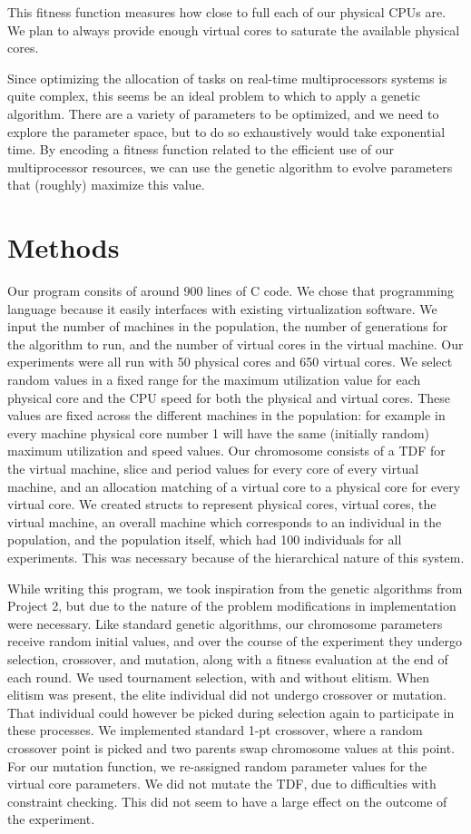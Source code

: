 \documentclass[11pt]{article}
\begin{document}
This fitness function measures how close to full each of our physical CPUs are. We plan to always provide enough virtual cores to saturate the available physical cores. 

Since optimizing the allocation of tasks on real-time multiprocessors systems is quite complex, this seems be an  ideal problem to which to apply a genetic algorithm. There are a variety of parameters to be optimized, and we need to explore the parameter space, but to do so exhaustively would take exponential time. By encoding a fitness function related to the efficient use of our multiprocessor resources, we can use the genetic algorithm to evolve parameters that (roughly) maximize this value.

\section{Methods}

Our program consits of around 900 lines of C code. We chose that programming language because it easily interfaces with existing virtualization software. We input the number of machines in the population, the number of generations for the algorithm to run, and the number of virtual cores in the virtual machine. Our experiments were all run with 50 physical cores and 650 virtual cores. We select random values in a fixed range for the maximum utilization value for each physical core and the CPU speed for both the physical and virtual cores. These values are fixed across the different machines in the population: for example in every machine physical core number 1 will have the same (initially random) maximum utilization and speed values. Our chromosome consists of a TDF for the virtual machine, slice and period values for every core of every virtual machine, and an allocation matching of a virtual core to a physical core for every virtual core. We created structs to represent physical cores, virtual cores, the virtual machine, an overall machine which corresponds to an individual in the population, and the population itself, which had 100 individuals for all experiments. This was necessary because of the hierarchical nature of this system. 

While writing this program, we took inspiration from the genetic algorithms from Project 2, but due to the nature of the problem modifications in implementation were necessary. Like standard genetic algorithms, our chromosome parameters receive random initial values, and over the course of the experiment they undergo selection, crossover, and mutation, along with a fitness evaluation at the end of each round. We used tournament selection, with and without elitism. When elitism was present, the elite individual did not undergo crossover or mutation. That individual could however be picked during selection again to participate in these processes. We implemented standard 1-pt crossover, where a random crossover point is picked and two parents swap chromosome values at this point. For our mutation function, we re-assigned random parameter values for the virtual core parameters. We did not mutate the TDF, due to difficulties with constraint checking. This did not seem to have a large effect on the outcome of the experiment. 
\end{document}

